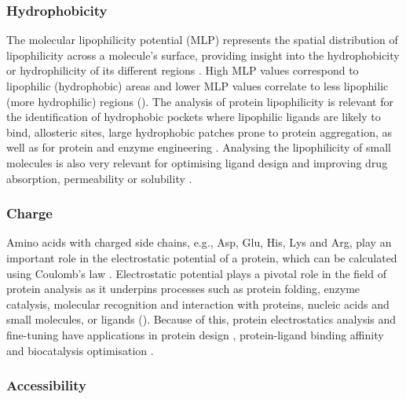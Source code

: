 \subsubsection{Hydrophobicity}

The molecular lipophilicity potential (MLP) represents the spatial distribution of lipophilicity across a molecule’s surface, providing insight into the hydrophobicity or hydrophilicity of its different regions \cite{BROTO_1984_MLP, LAGUERRE_1997_MLP}. High MLP values correspond to lipophilic (hydrophobic) areas and lower MLP values correlate to less lipophilic (more hydrophilic) regions (). The analysis of protein lipophilicity is relevant for the identification of hydrophobic pockets where lipophilic ligands are likely to bind, allosteric sites, large hydrophobic patches prone to protein aggregation, as well as for protein and enzyme engineering \cite{EFREMOV_2007_MLP}. Analysing the lipophilicity of small molecules is also very relevant for optimising ligand design and improving drug absorption, permeability or solubility \cite{GAILLARD_1994_MLP}.

\subsubsection{Charge}

Amino acids with charged side chains, e.g., Asp, Glu, His, Lys and Arg, play an important role in the electrostatic potential of a protein, which can be calculated using Coulomb's law \cite{COULOMB_1785_LAW}. Electrostatic potential plays a pivotal role in the field of protein analysis as it underpins processes such as protein folding, enzyme catalysis, molecular recognition and interaction with proteins, nucleic acids and small molecules, or ligands \cite{ZHOU_2018_ESP} (). Because of this, protein electrostatics analysis and fine-tuning have applications in protein design \cite{GORHAM_2011_ESP}, protein-ligand binding affinity \cite{KUKIC_2010_ELECTROSTATICS} and biocatalysis optimisation \cite{VASCON_2020_ESP}.

\subsubsection{Accessibility}

